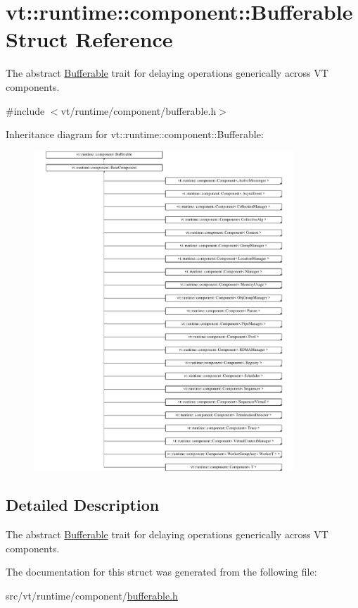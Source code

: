 \hypertarget{structvt_1_1runtime_1_1component_1_1_bufferable}{}\section{vt\+:\+:runtime\+:\+:component\+:\+:Bufferable Struct Reference}
\label{structvt_1_1runtime_1_1component_1_1_bufferable}


The abstract {\ttfamily \hyperlink{structvt_1_1runtime_1_1component_1_1_bufferable}{Bufferable}} trait for delaying operations generically across VT components.  




{\ttfamily \#include $<$vt/runtime/component/bufferable.\+h$>$}

Inheritance diagram for vt\+:\+:runtime\+:\+:component\+:\+:Bufferable\+:\begin{figure}[H]
\begin{center}
\leavevmode
\includegraphics[height=12.000000cm]{structvt_1_1runtime_1_1component_1_1_bufferable}
\end{center}
\end{figure}


\subsection{Detailed Description}
The abstract {\ttfamily \hyperlink{structvt_1_1runtime_1_1component_1_1_bufferable}{Bufferable}} trait for delaying operations generically across VT components. 

The documentation for this struct was generated from the following file\+:\begin{DoxyCompactItemize}
\item 
src/vt/runtime/component/\hyperlink{bufferable_8h}{bufferable.\+h}\end{DoxyCompactItemize}

